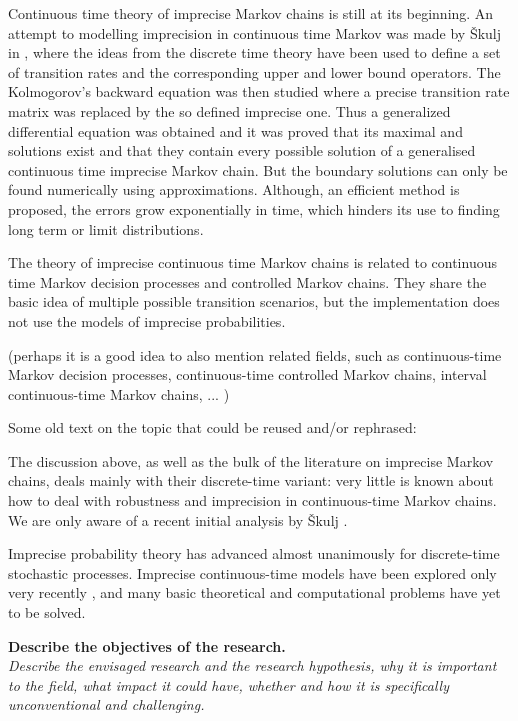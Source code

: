 \documentclass[11pt,dvipsnames,usenames,a4paper]{article}
\begin{document}
Continuous time theory of imprecise Markov chains is still at its beginning. An attempt to modelling imprecision in continuous time Markov was made by Škulj in \cite{skulj2015:continuous:bounds}, where the ideas from the discrete time theory have been used to define a set of transition rates and the corresponding upper and lower bound operators. The Kolmogorov's backward equation was then studied where a precise transition rate matrix was replaced by the so defined imprecise one. Thus a generalized differential equation was obtained and it was proved that its maximal and solutions exist and that they contain every possible solution of a generalised continuous time imprecise Markov chain. But the boundary solutions can only be found numerically using approximations. Although, an efficient method is proposed, the errors grow exponentially in time, which hinders its use to finding long term or limit distributions.

The theory of imprecise continuous time Markov chains is related to continuous time Markov decision processes and controlled Markov chains. They share the basic idea of multiple possible transition scenarios, but the implementation does not use the models of imprecise probabilities. 


(perhaps it is a good idea to also mention related fields, such as continuous-time Markov decision processes, continuous-time controlled Markov chains, interval continuous-time Markov chains, ... )

{\color{Gray}
Some old text on the topic that could be reused and/or rephrased:

The discussion above, as well as the bulk of the literature on imprecise Markov chains, deals mainly with their discrete-time variant: very little is known about how to deal with robustness and imprecision in continuous-time Markov chains. 
We are only aware of a recent initial analysis by \v{S}kulj \cite{skulj2015:continuous:bounds}.

Imprecise probability theory has advanced almost unanimously for discrete-time stochastic processes.
Imprecise continuous-time models have been explored only very recently \cite{skulj2015:continuous:bounds,Troffaes+GSB-ISIPTA15p}, and many basic theoretical and computational problems have yet to be solved.
}

\vspace{3mm}

\textbf{Describe the objectives of the research.}\\
\textit{Describe the envisaged research and the research hypothesis, why it is important to the field, what impact it could have, whether and how it is specifically unconventional and challenging.}
\end{document}
